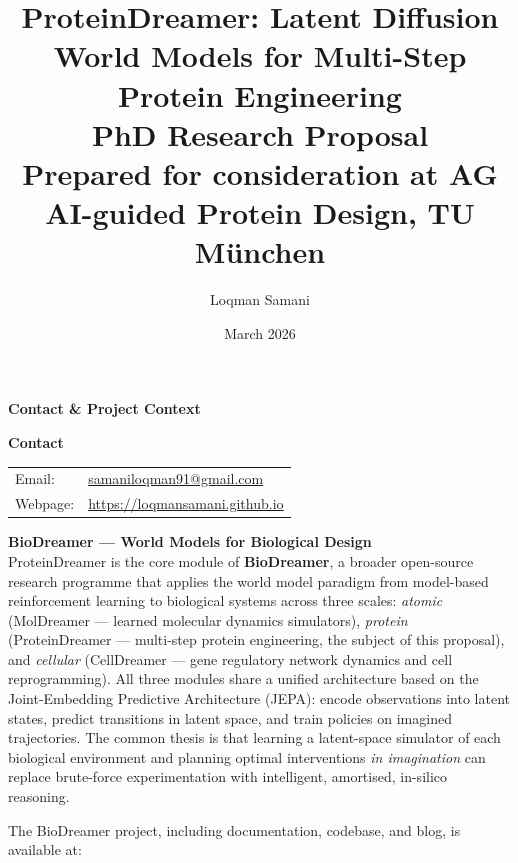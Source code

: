 \documentclass[12pt, a4paper]{article}
\title{
    \textbf{ProteinDreamer: Latent Diffusion World Models for Multi-Step Protein Engineering}\\[0.8em]
    \large PhD Research Proposal\\[0.4em]
    \normalsize Prepared for consideration at AG AI-guided Protein Design, TU München
}
\author{Loqman Samani}
\date{March 2026}
\begin{document}
\maketitle
\thispagestyle{empty}
\newpage

\thispagestyle{empty}
\vspace*{2cm}

\begin{center}
{\Large \textbf{Contact \& Project Context}}
\end{center}

\vspace{1.5cm}

\noindent\textbf{Contact}\\[0.4em]
\begin{tabular}{@{}ll}
Email: & \href{mailto:samaniloqman91@gmail.com}{samaniloqman91@gmail.com} \\
Webpage: & \url{https://loqmansamani.github.io} \\
\end{tabular}

\vspace{1.5cm}

\noindent\textbf{BioDreamer --- World Models for Biological Design}\\[0.4em]
\noindent ProteinDreamer is the core module of \textbf{BioDreamer}, a broader open-source research programme that applies the world model paradigm from model-based reinforcement learning to biological systems across three scales: \textit{atomic} (MolDreamer --- learned molecular dynamics simulators), \textit{protein} (ProteinDreamer --- multi-step protein engineering, the subject of this proposal), and \textit{cellular} (CellDreamer --- gene regulatory network dynamics and cell reprogramming). All three modules share a unified architecture based on the Joint-Embedding Predictive Architecture (JEPA): encode observations into latent states, predict transitions in latent space, and train policies on imagined trajectories. The common thesis is that learning a latent-space simulator of each biological environment and planning optimal interventions \textit{in imagination} can replace brute-force experimentation with intelligent, amortised, in-silico reasoning.

\vspace{0.8em}
\noindent The BioDreamer project, including documentation, codebase, and blog, is available at:
\end{document}
